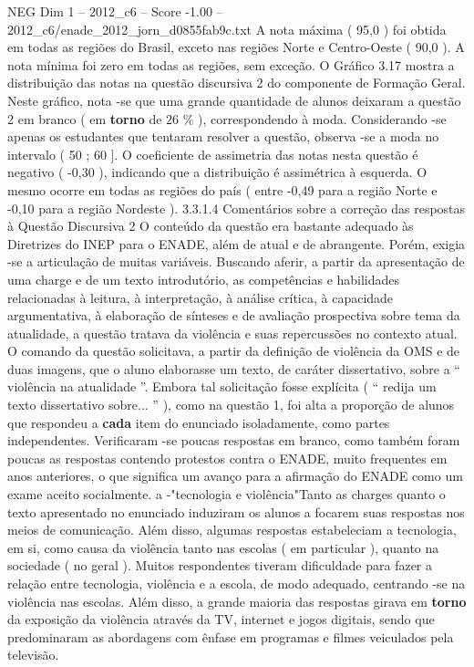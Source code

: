 \begin{textsample}{NEG Dim 1 – 2012\_c6 – Score -1.00 – 2012\_c6/enade\_2012\_jorn\_d0855fab9c.txt}
A nota máxima ( 95,0 ) foi obtida em todas as regiões do Brasil, exceto nas regiões Norte e Centro-Oeste ( 90,0 ).
A nota mínima foi zero em todas as regiões, sem exceção.
O Gráfico 3.17 mostra a distribuição das notas na questão discursiva 2 do componente de Formação Geral.
Neste gráfico, nota -se que uma grande quantidade de alunos deixaram a questão 2 em branco ( em \textbf{torno} de 26 \% ), correspondendo à moda.
Considerando -se apenas os estudantes que tentaram resolver a questão, observa -se a moda no intervalo ( 50 ; 60 ].
O coeficiente de assimetria das notas nesta questão é negativo ( -0,30 ), indicando que a distribuição é assimétrica à esquerda.
O mesmo ocorre em todas as regiões do país ( entre -0,49 para a região Norte e -0,10 para a região Nordeste ). 3.3.1.4 Comentários sobre a correção das respostas à Questão Discursiva 2 O conteúdo da questão era bastante adequado às Diretrizes do INEP para o ENADE, além de atual e de abrangente.
Porém, exigia -se a articulação de muitas variáveis.
Buscando aferir, a partir da apresentação de uma charge e de um texto introdutório, as competências e habilidades relacionadas à leitura, à interpretação, à análise crítica, à capacidade argumentativa, à elaboração de sínteses e de avaliação prospectiva sobre tema da atualidade, a questão tratava da violência e suas repercussões no contexto atual.
O comando da questão solicitava, a partir da definição de violência da OMS e de duas imagens, que o aluno elaborasse um texto, de caráter dissertativo, sobre a “ violência na atualidade ”.
Embora tal solicitação fosse explícita ( “ redija um texto dissertativo sobre... ” ), como na questão 1, foi alta a proporção de alunos que respondeu a \textbf{cada} item do enunciado isoladamente, como partes independentes.
Verificaram -se poucas respostas em branco, como também foram poucas as respostas contendo protestos contra o ENADE, muito frequentes em anos anteriores, o que significa um avanço para a afirmação do ENADE como um exame aceito socialmente. a -"tecnologia e violência"Tanto as charges quanto o texto apresentado no enunciado induziram os alunos a focarem suas respostas nos meios de comunicação.
Além disso, algumas respostas estabeleciam a tecnologia, em si, como causa da violência tanto nas escolas ( em particular ), quanto na sociedade ( no geral ).
Muitos respondentes tiveram dificuldade para fazer a relação entre tecnologia, violência e a escola, de modo adequado, centrando -se na violência nas escolas.
Além disso, a grande maioria das respostas girava em \textbf{torno} da exposição da violência através da TV, internet e jogos digitais, sendo que predominaram as abordagens com ênfase em programas e filmes veiculados pela televisão.

\end{textsample}
